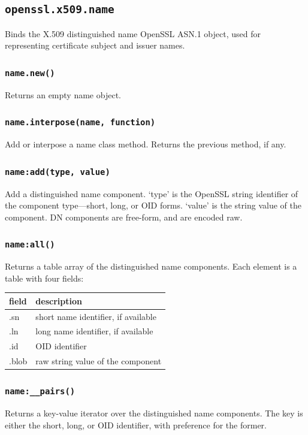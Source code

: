 \documentclass[11pt, oneside]{memoir}
\newcommand*{\fn}[1]{\texttt{#1}\xspace}
\newcounter{toccols}
\newenvironment{Module}[1]{
	\subsection{\texttt{#1}}
	\addtocontents{toc}{
		\protect\begin{multicols}{\value{toccols}}
	}
}{
	\addtocontents{toc}{\protect\end{multicols}}
}
\begin{document}
\begin{Module}{openssl.x509.name}

Binds the X.509 distinguished name OpenSSL ASN.1 object, used for representing certificate subject and issuer names.

\subsubsection[\fn{name.new}]{\fn{name.new()}}

Returns an empty name object.

\subsubsection[\fn{name.interpose}]{\fn{name.interpose(name, function)}}

Add or interpose a name class method. Returns the previous method, if any.

\subsubsection[\fn{name:add}]{\fn{name:add(type, value)}}

Add a distinguished name component. `type' is the OpenSSL string identifier of the component type---short, long, or OID forms. `value' is the string value of the component. DN components are free-form, and are encoded raw.

\subsubsection[\fn{name:all}]{\fn{name:all()}}

Returns a table array of the distinguished name components. Each element is a table with four fields:

\begin{tabular}{ l | l}
field & description\\\hline
.sn & short name identifier, if available\\
.ln & long name identifier, if available\\
.id & OID identifier\\
.blob & raw string value of the component
\end{tabular}

\subsubsection[\fn{name:\_\_pairs}]{\fn{name:\_\_pairs()}}

Returns a key-value iterator over the distinguished name components. The key is either the short, long, or OID identifier, with preference for the former.

\end{Module}
\end{document}
